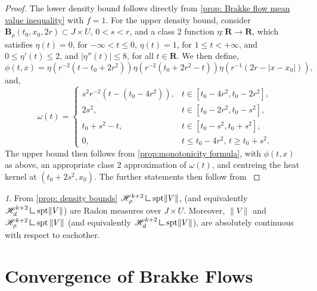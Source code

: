 \documentclass{article}
\theoremstyle{plain}
\theoremstyle{definition}
\theoremstyle{plain}
\theoremstyle{remark}
\newtheorem{propparagraph}[theorem]{}
\theoremstyle{remark}
\theoremstyle{plain}
\newcommand{\weight}{\mathbin{\vrule height 1.6ex depth 0pt width
		0.14ex\vrule height 0.14ex depth 0pt width 1.3ex}}
\begin{document}
\begin{proof}
    The lower density bound follows directly from \ref{prop: Brakke flow mean value inequality} with $f = 1$.
    For the upper density bound, consider $\mathbf{B}_{\rho} (t_{0}, x_{0}, 2r) \subset J \times U$, $0 < s < r$, and a class 2 function $\eta \colon \mathbf{R} \rightarrow \mathbf{R}$, which satisfies $\eta (t) = 0$, for $-\infty < t \leq 0$, $\eta (t) = 1$, for $1 \leq t < + \infty$, and $0 \leq \eta' (t) \leq 2$, and $|\eta'' (t)| \leq 8$, for all $t \in \mathbf{R}$. 
    We then define, 
    \begin{equation*}
        \phi (t, x) = \eta (r^{-2} (t - t_{0} + 2 r^{2})) \eta (r^{-2} (t_{0} + 2 r^{2} - t))\eta (r^{-1} (2 r - | x - x_{0}|)),
    \end{equation*}
    and, 
    \begin{equation*}
        \omega (t) = \begin{cases}
            s^{2}r^{-2} (t - (t_{0} - 4r^{2})), & t \in [t_{0} - 4r^{2}, t_{0} - 2 r^{2}], \\
            2 s^{2}, & t \in [t_{0} - 2 r^{2}, t_{0} - s^{2}], \\
            t_{0} + s^{2} - t, & t \in [t_{0} - s^{2}, t_{0} + s^{2}], \\ 
            0, & t \leq t_{0} - 4r^{2}, \, t \geq t_{0} + s^{2}.
        \end{cases}
    \end{equation*}
    The upper bound then follows from \ref{prop:monotonicity formula}, with $\phi (t, x)$ as above, an appropriate class 2 approximation of $\omega (t)$, and centreing the heat kernel at $(t_{0} + 2 s^{2}, x_{0})$.
    The further statements then follow from \cite[2.10.19]{MR41:1976}
\end{proof}

\begin{propparagraph}\label{proppara: a.c. of weight measure and hausdorff measure for Brakke flows}
    From \ref{prop: density bounds} $\mathscr{H}^{k + 2}_{\rho} \weight \mathrm{spt} \| V \|$, (and equivalently $\mathscr{H}^{k + 2}_{d} \weight \mathrm{spt} \| V \|$) are Radon measures over $J \times U$.
    Moreover, $\| V \|$ and $\mathscr{H}_{\rho}^{k + 2} \weight \mathrm{spt} \, \| V \|$ (and equivalently $\mathscr{H}^{k + 2}_{d} \weight \mathrm{spt} \| V \|$), are absolutely continuous with respect to eachother.
\end{propparagraph}

\section{Convergence of Brakke Flows}\label{sec: convergence of Brakke Flows}
\end{document}
